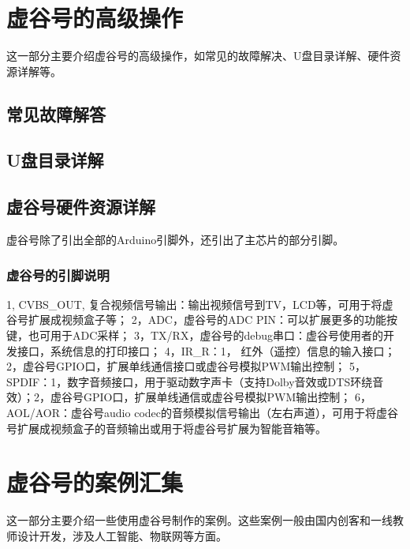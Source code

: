 \documentclass[letterpaper,10pt,english]{sphinxmanual}
\begin{document}
\chapter{虚谷号的高级操作}
\label{\detokenize{08.advanced/index::doc}}\label{\detokenize{08.advanced/index:id1}}
这一部分主要介绍虚谷号的高级操作，如常见的故障解决、U盘目录详解、硬件资源详解等。


\section{常见故障解答}
\label{\detokenize{08.advanced/8.1::doc}}\label{\detokenize{08.advanced/8.1:id1}}

\section{U盘目录详解}
\label{\detokenize{08.advanced/8.2::doc}}\label{\detokenize{08.advanced/8.2:u}}

\section{虚谷号硬件资源详解}
\label{\detokenize{08.advanced/8.3::doc}}\label{\detokenize{08.advanced/8.3:id1}}
虚谷号除了引出全部的Arduino引脚外，还引出了主芯片的部分引脚。


\subsection{虚谷号的引脚说明}
\label{\detokenize{08.advanced/8.3:id2}}
1, CVBS\_OUT, 复合视频信号输出：输出视频信号到TV，LCD等，可用于将虚谷号扩展成视频盒子等；
2，ADC，虚谷号的ADC PIN：可以扩展更多的功能按键，也可用于ADC采样；
3，TX/RX，虚谷号的debug串口：虚谷号使用者的开发接口，系统信息的打印接口；
4，IR\_R：1， 红外（遥控）信息的输入接口；2，虚谷号GPIO口，扩展单线通信接口或虚谷号模拟PWM输出控制；
5，SPDIF：1，数字音频接口，用于驱动数字声卡（支持Dolby音效或DTS环绕音效）；2，虚谷号GPIO口，扩展单线通信或虚谷号模拟PWM输出控制；
6，AOL/AOR：虚谷号audio codec的音频模拟信号输出（左右声道），可用于将虚谷号扩展成视频盒子的音频输出或用于将虚谷号扩展为智能音箱等。

\noindent{}


\chapter{虚谷号的案例汇集}
\label{\detokenize{09.case/index::doc}}\label{\detokenize{09.case/index:id1}}
这一部分主要介绍一些使用虚谷号制作的案例。这些案例一般由国内创客和一线教师设计开发，涉及人工智能、物联网等方面。
\end{document}
